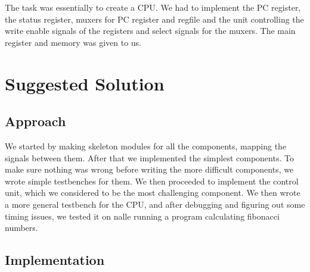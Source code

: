 \documentclass[11pt]{report}
\begin{document}
The task was essentially to create a CPU. We had to implement the PC
register, the status register, muxers for PC register and regfile and
the unit controlling the write enable signals of the registers and
select signals for the muxers.  The main register and memory was given
to us.

\section*{Suggested Solution}


\subsection*{Approach}

We started by making skeleton modules for all the components, mapping
the signals between them. After that we implemented the simplest
components. To make sure nothing was wrong before writing the more
difficult components, we wrote simple testbenches for them. We then
proceeded to implement the control unit, which we considered to be the
most challenging component. We then wrote a more general testbench for
the CPU, and after debugging and figuring out some timing issues, we
tested it on nalle running a program calculating fibonacci numbers.

\subsection*{Implementation}
\end{document}
